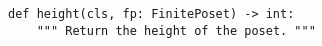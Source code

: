 \begin{verbatim}
def height(cls, fp: FinitePoset) -> int:
    """ Return the height of the poset. """
\end{verbatim}